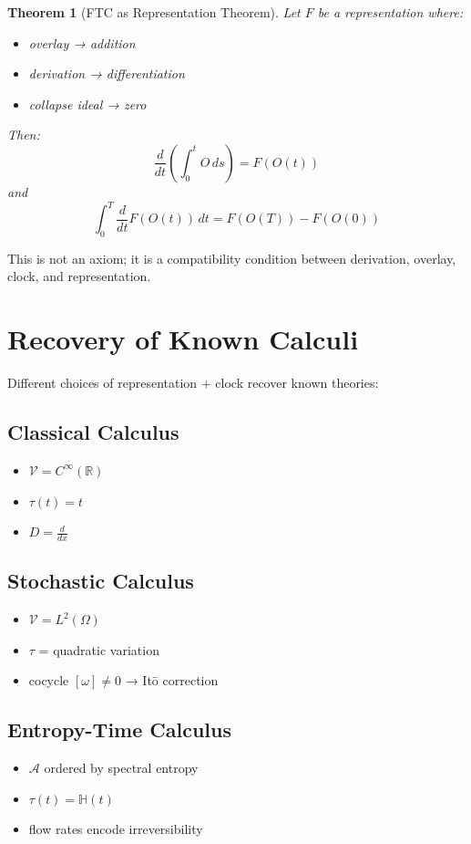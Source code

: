 \documentclass[12pt, oneside]{article}
\newtheorem{theorem}{Theorem}[section]
\newcommand{\A}{\mathcal{A}}
\begin{document}
\begin{theorem}[FTC as Representation Theorem]
Let $F$ be a representation where:
\begin{itemize}
    \item overlay → addition
    \item derivation → differentiation
    \item collapse ideal → zero
\end{itemize}
Then:
\begin{equation}
\frac{d}{dt} \left( \int_0^t O \, ds \right) = F(O(t))
\end{equation}
and
\begin{equation}
\int_0^T \frac{d}{dt} F(O(t)) \, dt = F(O(T)) - F(O(0))
\end{equation}
\end{theorem}

This is not an axiom; it is a compatibility condition between derivation, overlay, clock, and representation.

\section{Recovery of Known Calculi}

Different choices of representation + clock recover known theories:

\subsection{Classical Calculus}
\begin{itemize}
    \item $\mathcal{V} = C^\infty(\mathbb{R})$
    \item $\tau(t) = t$
    \item $D = \frac{d}{dx}$
\end{itemize}

\subsection{Stochastic Calculus}
\begin{itemize}
    \item $\mathcal{V} = L^2(\Omega)$
    \item $\tau$ = quadratic variation
    \item cocycle $[\omega] \neq 0$ → Itō correction
\end{itemize}

\subsection{Entropy-Time Calculus}
\begin{itemize}
    \item $\A$ ordered by spectral entropy
    \item $\tau(t) = \mathbb{H}(t)$
    \item flow rates encode irreversibility
\end{itemize}
\end{document}
